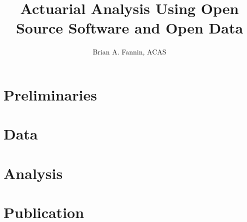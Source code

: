 \documentclass{book}
\begin{document}
\title{Actuarial Analysis Using Open Source Software and Open Data}
\author{Brian A. Fannin, ACAS}

\maketitle


\frontmatter
\tableofcontents



\mainmatter

\setcounter{page}{1}

\part{Preliminaries}









\part{Data}


\part{Analysis}





\part{Publication}


%

\clearpage
\printindex
\end{document}
